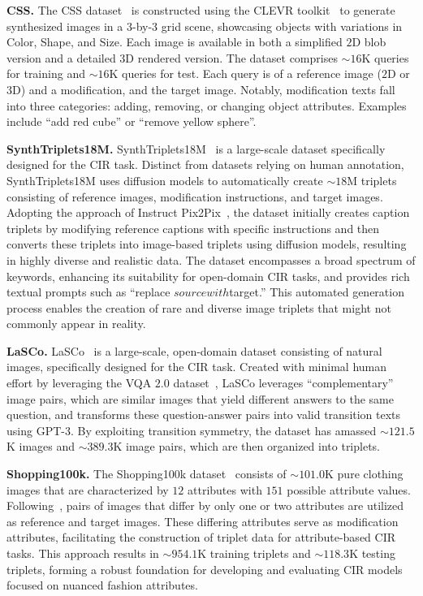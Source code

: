 \textbf{CSS.} The CSS dataset~\cite{vo2019tirg} is constructed using the CLEVR toolkit~\cite{johnson2017clevr} to generate synthesized images in a $3$-by-$3$ grid scene, showcasing objects with variations in Color, Shape, and Size. Each image is available in both a simplified $2$D blob version and a detailed $3$D rendered version. The dataset comprises $\sim16$K queries for training and $\sim16$K queries for test. Each query is of a reference image ($2$D or $3$D) and a modification, and the target image. Notably, modification texts fall into three categories: adding, removing, or changing object attributes. Examples include ``add red cube'' or ``remove yellow sphere''.  


\textbf{SynthTriplets18M.} SynthTriplets18M~\cite{compodiff} is a large-scale dataset specifically designed for the CIR task. Distinct from datasets relying on human annotation, SynthTriplets18M uses diffusion models to automatically create $\sim18$M triplets consisting of reference images, modification instructions, and target images. Adopting the approach of Instruct Pix2Pix~\cite{brooks2023pix}, the dataset initially creates caption triplets by modifying reference captions with specific instructions and then converts these triplets into image-based triplets using diffusion models, resulting in highly diverse and realistic data. The dataset encompasses a broad spectrum of keywords, enhancing its suitability for open-domain CIR tasks, and provides rich textual prompts such as ``replace ${source} with ${target}.'' This automated generation process enables the creation of rare and diverse image triplets that might not commonly appear in reality.

\textbf{LaSCo.} LaSCo~\cite{levy2024case} is a large-scale, open-domain dataset consisting of natural images, specifically designed for the CIR task. Created with minimal human effort by leveraging the VQA $2.0$ dataset~\cite{goyal2017vqa}, LaSCo leverages ``complementary'' image pairs, which are similar images that yield different answers to the same question, and transforms these question-answer pairs into valid transition texts using GPT-$3$. By exploiting transition symmetry, the dataset has amassed $\sim121.5$K images and $\sim389.3$K image pairs, which are then organized into triplets.


\textbf{Shopping100k.} The Shopping100k dataset~\cite{EMASL} consists of $\sim101.0$K pure clothing images that are characterized by $12$ attributes with $151$ possible attribute values. Following~\cite{adde}, pairs of images that differ by only one or two attributes are utilized as reference and target images. These differing attributes serve as modification attributes, facilitating the construction of triplet data for attribute-based CIR tasks. This approach results in $\sim954.1$K training triplets and $\sim118.3$K testing triplets, forming a robust foundation for developing and evaluating CIR models focused on nuanced fashion attributes. 


